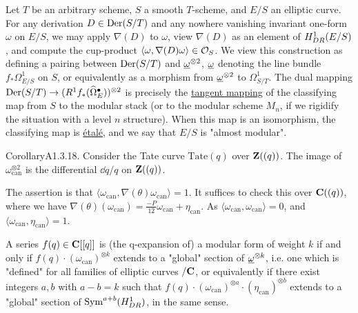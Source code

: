 Let $T$ be an arbitrary scheme, $S$ a smooth $T$-scheme, and $E/S$ an elliptic
curve. For any derivation $D\in\operatorname{Der}(S/T)$ and any nowhere vanishing invariant
one-form $\omega$ on $E/S$, we may apply $\nabla(D)$ to $\omega$, view
$\nabla(D)$ as an element of $H^1_{DR}(E/S)$, and compute the cup-product
$\langle\omega,\nabla(D)\omega\rangle\in\mathcal{O}_S$. We view this construction as
defining a pairing between $\operatorname{Der}(S/T)$ and $\underline{\omega}^{\otimes 2}$, $\underline{\omega}$ denoting the
line bundle $f_*\Omega^1_{E/S}$ on $S$, or equivalently as a morphism from
$\underline{\omega}^{\otimes 2}$ to $\Omega^1_{S/T}$. The dual mapping
$\operatorname{Der}(S/T)\to(R^1f_*(\widehat{\Omega}^\bullet_E))^{\otimes 2}$ is precisely the
\uline{tangent mapping} of the classifying map from $S$ to the modular stack (or
to the modular scheme $M_n$, if we rigidify the situation with a level $n$
structure). When this map is an isomorphism, the classifying map is
\uline{\'etal\'e}, and we say that $E/S$ is "almost modular".

\begin{kathm}{Corollary}{A1.3.18.}
Consider the Tate curve $\mathrm{Tate}(q)$ over $\mathbf{Z}((q))$. The image of
$\omega_{\mathrm{can}}^{\otimes 2}$ is the differential $\dd q/q$ on $\mathbf{Z}((q))$.
\end{kathm}

\begin{kaproof}
The assertion is that
$\langle\omega_{\mathrm{can}},\nabla(\theta)\omega_{\mathrm{can}}\rangle=1$. It
suffices to check this over $\mathbf{C}((q))$, where we have
$\nabla(\theta)(\omega_{\mathrm{can}})=\frac{-P}{12}\omega_{\mathrm{can}}+\eta_{\mathrm{can}}$.
As $\langle\omega_{\mathrm{can}},\omega_{\mathrm{can}}\rangle=0$, and
$\langle\omega_{\mathrm{can}},\eta_{\mathrm{can}}\rangle=1$.
\end{kaproof}


A series $f(q)\in\mathbf{C}[[q]]$ is (the q-expansion of) a modular form of weight $k$
if and only if $f(q)\cdot(\omega_{\mathrm{can}})^{\otimes k}$ extends to a
"global" section of $\underline{\omega}^{\otimes k}$, i.e. one which is "defined" for all
families of elliptic curves $/\mathbf{C}$, or equivalently if there exist integers $a,b$
with $a-b=k$ such that
$f(q)\cdot(\omega_{\mathrm{can}})^{\otimes a}\cdot(\eta_{\mathrm{can}})^{\otimes b}$
extends to a "global" section of $\operatorname{Sym}^{a+b}(H^1_{DR})$, in the same sense.


